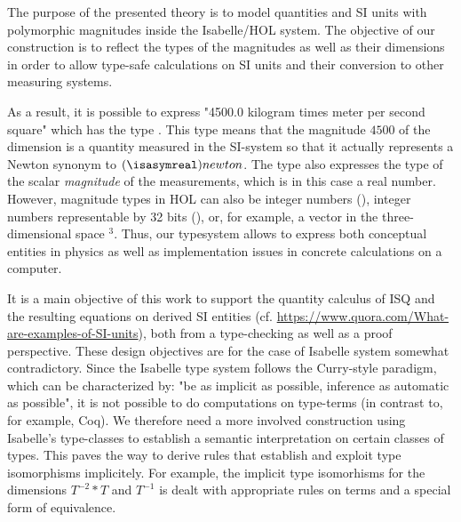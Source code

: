 \documentclass[11pt,a4paper]{book}
\begin{document}
The purpose of the presented theory is to model quantities and SI units with polymorphic magnitudes 
inside the Isabelle/HOL\cite{nipkow.ea:isabelle:2002} system. The objective of our construction is to
reflect the types of the magnitudes as well as their dimensions in order to allow type-safe 
calculations on SI units and their conversion to other measuring systems.

As a result, it is possible to express "4500.0 kilogram times meter per second square" which has 
the type 
. 
This type means that the magnitude $4500$ of the dimension 
 is a quantity measured in the SI-system so that it actually
represents a Newton synonym to $(\isasymreal)newton$.
 The type also expresses the type of the scalar \emph{magnitude} of the 
measurements, which is in this case a real number. However, magnitude types in HOL can also be 
integer numbers (), integer numbers representable by 32 bits (), or, for example,
a vector in the three-dimensional space  \isa{\isasymreal}$^3$. Thus, our typesystem allows
to express both conceptual entities in physics as well as 
implementation issues in concrete calculations on a computer.

It is a main objective of this work to support the quantity calculus of ISQ and the resulting 
equations on derived SI entities (cf. \url{https://www.quora.com/What-are-examples-of-SI-units}),
both from a type-checking as well as a proof perspective.
These design objectives are for the case of Isabelle system somewhat contradictory.
Since the Isabelle type system follows the Curry-style paradigm, which can be 
characterized by: "be as implicit as possible, inference as automatic as possible", it is not
possible to do computations on type-terms (in contrast to, for example, Coq). We therefore
need a more involved construction using Isabelle's type-classes to establish a semantic 
interpretation on certain classes of types. This paves the way to derive rules that
establish and exploit type isomorphisms implicitely. For example, the implicit
type isomorhisms for the dimensions $T^{-2} * T$ and $T^{-1}$ is dealt with appropriate
rules on terms and a special form of equivalence. 
\end{document}
